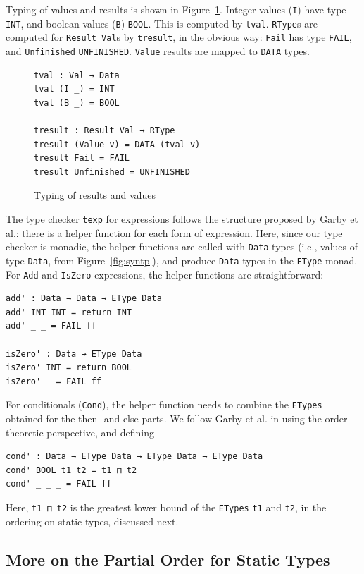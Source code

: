 \documentclass[acmsmall,screen,review]{acmart}
\begin{document}
Typing of values and results is shown in Figure~\ref{fig:tpvr}.  Integer values (\verb|I|) have type \verb|INT|,
and boolean values (\verb|B|) \verb|BOOL|.  This is computed by \verb|tval|.  \verb|RType|s are computed for
\verb|Result Val|s by \verb|tresult|, in the obvious way: \verb|Fail| has type \verb|FAIL|, and \verb|Unfinished|
\verb|UNFINISHED|.  \verb|Value| results are mapped to \verb|DATA| types.  

\begin{figure}
\begin{verbatim}
tval : Val → Data
tval (I _) = INT
tval (B _) = BOOL

tresult : Result Val → RType
tresult (Value v) = DATA (tval v)
tresult Fail = FAIL 
tresult Unfinished = UNFINISHED
\end{verbatim}
\caption{Typing of results and values}
\label{fig:tpvr}
\end{figure}

The type checker \verb|texp| for expressions follows the structure
proposed by Garby et al.: there is a helper function for each form of
expression.  Here, since our type checker is monadic, the helper
functions are called with \verb|Data| types (i.e., values of type
\verb|Data|, from Figure~\ref{fig:syntp}), and produce \verb|Data|
types in the \verb|EType| monad.  For \verb|Add| and \verb|IsZero|
expressions, the helper functions are straightforward:

\begin{verbatim}
add' : Data → Data → EType Data
add' INT INT = return INT
add' _ _ = FAIL ff

isZero' : Data → EType Data
isZero' INT = return BOOL
isZero' _ = FAIL ff
\end{verbatim}

For conditionals (\verb|Cond|), the helper function needs to combine
the \verb|ETypes| obtained for the then- and else-parts.  We follow
Garby et al. in using the order-theoretic perspective, and defining

\begin{verbatim}
cond' : Data → EType Data → EType Data → EType Data
cond' BOOL t1 t2 = t1 ⊓ t2 
cond' _ _ _ = FAIL ff
\end{verbatim}

\noindent Here, \verb|t1 ⊓ t2| is the greatest lower bound of the
\verb|ETypes| \verb|t1| and \verb|t2|, in the ordering on static
types, discussed next.

\subsection{More on the Partial Order for Static Types}
\label{sec:po}
\end{document}
